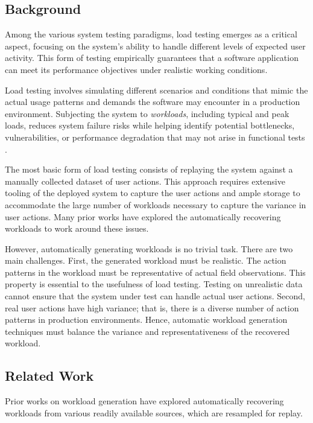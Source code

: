 \subsection{Background}

Among the various system testing paradigms, load testing emerges as a critical aspect, focusing on the system's ability to handle different levels of expected user activity. This form of testing empirically guarantees that a software application can meet its performance objectives under realistic working conditions.

Load testing involves simulating different scenarios and conditions that mimic the actual usage patterns and demands the software may encounter in a production environment. Subjecting the system to \emph{workloads}, including typical and peak loads, reduces system failure risks while helping identify potential bottlenecks, vulnerabilities, or performance degradation that may not arise in functional tests \cite{Syer2017-ek, Shang2015-gj, Cohen2005-mn, Hassan2008-nj, Chen2016-bo}.

The most basic form of load testing consists of replaying the system against a manually collected dataset of user actions. This approach requires extensive tooling of the deployed system to capture the user actions and ample storage to accommodate the large number of workloads necessary to capture the variance in user actions. Many prior works have explored the automatically recovering workloads to work around these issues.

However, automatically generating workloads is no trivial task. There are two main challenges. First, the generated workload must be realistic. The action patterns in the workload must be representative of actual field observations. This property is essential to the usefulness of load testing. Testing on unrealistic data cannot ensure that the system under test can handle actual user actions. Second, real user actions have high variance; that is, there is a diverse number of action patterns in production environments. Hence, automatic workload generation techniques must balance the variance and representativeness of the recovered workload.

\subsection{Related Work}

Prior works on workload generation have explored automatically recovering workloads from various readily available sources, which are resampled for replay.

